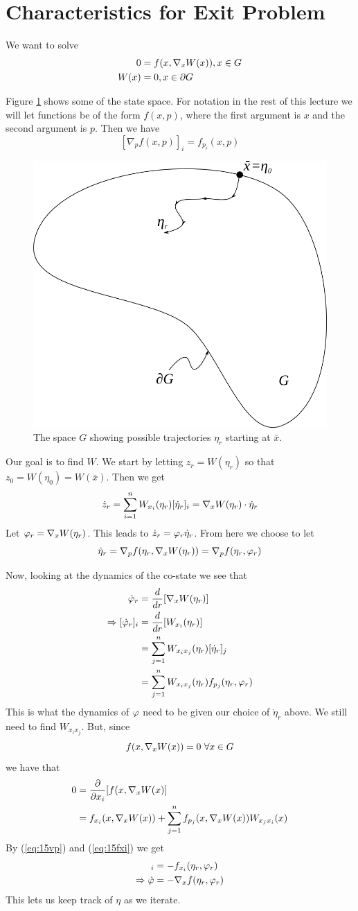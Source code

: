\section{Characteristics for Exit Problem}
We want to solve
\begin{align*}
0 &= f(x,\nabla_xW(x)), x\in G \\
W(x) &= 0, x\in\partial G
\end{align*}

Figure \ref{fig:15g} shows some of the state space. For notation in the rest of this lecture we will let functions be of the form $f(x,p)$, where the first argument is $x$ and the second argument is $p$. Then we have
$$[\nabla_pf(x,p)]_i = f_{p_i}(x,p)$$

\begin{figure}[ht!]
	\centering
	\includegraphics[width=.4\textwidth]{images/15g}
	\caption{The space $G$ showing possible trajectories $\eta_r$ starting at $\bar{x}$.}
	\label{fig:15g}
\end{figure}

Our goal is to find $W$. We start by letting $z_r=W(\eta_r)$ so that $z_0=W(\eta_0)=W(\bar{x})$. Then we get
$$\dot{z}_r = \sum_{i=1}^n W_{x_i}(\eta_r)[\dot{\eta}_r]_i = \nabla_xW(\eta_r)\cdot \dot{\eta}_r$$
Let $\varphi_r=\nabla_xW(\eta_r)$. This leads to $\dot{z}_r=\varphi_r\dot{\eta}_r$. From here we choose to let
$$\dot{\eta}_r = \nabla_pf(\eta_r,\nabla_xW(\eta_r)) = \nabla_pf(\eta_r,\varphi_r)$$

Now, looking at the dynamics of the co-state we see that
\begin{align}
\label{eq:15vp}
\dot{\varphi}_r &= \frac{d}{dr}[\nabla_xW(\eta_r)] \nonumber \\
\Rightarrow [\dot{\varphi}_r]_i &= \frac{d}{dr}[W_{x_i}(\eta_r)] \nonumber \\
&= \sum_{j=1}^nW_{x_ix_j}(\eta_r)[\dot{\eta}_r]_j \nonumber \\
&= \sum_{j=1}^nW_{x_ix_j}(\eta_r)f_{p_j}(\eta_r,\varphi_r)
\end{align}
This is what the dynamics of $\varphi$ need to be given our choice of $\dot{\eta}_r$ above. We still need to find $W_{x_ix_j}$. But, since
$$f(x,\nabla_xW(x)) = 0 ~\forall x\in G$$
we have that
\begin{align}
\label{eq:15fxi}
0 &= \frac{\partial}{\partial x_i}[f(x,\nabla_xW(x)] \nonumber \\
&= f_{x_i}(x,\nabla_xW(x)) + \sum_{j=1}^nf_{p_j}(x,\nabla_xW(x))W_{x_jx_i}(x)
\end{align}
By (\ref{eq:15vp}) and (\ref{eq:15fxi}) we get
\begin{align*}
[\dot{\vp}_r]_i &= -f_{x_i}(\eta_r,\vp_r) \\
\Rightarrow \dot{\vp} &= -\nabla_xf(\eta_r,\vp_r)
\end{align*}
This lets us keep track of $\eta$ as we iterate.

